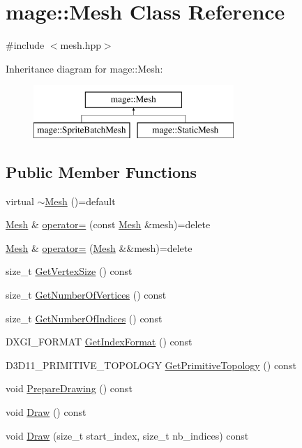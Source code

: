 \hypertarget{classmage_1_1_mesh}{}\section{mage\+:\+:Mesh Class Reference}
\label{classmage_1_1_mesh}


{\ttfamily \#include $<$mesh.\+hpp$>$}

Inheritance diagram for mage\+:\+:Mesh\+:\begin{figure}[H]
\begin{center}
\leavevmode
\includegraphics[height=2.000000cm]{classmage_1_1_mesh}
\end{center}
\end{figure}
\subsection*{Public Member Functions}
\begin{DoxyCompactItemize}
\item 
virtual \hyperlink{classmage_1_1_mesh_a53b4b9054a518c1f7e2078fdc65a95b8}{$\sim$\+Mesh} ()=default
\item 
\hyperlink{classmage_1_1_mesh}{Mesh} \& \hyperlink{classmage_1_1_mesh_a5baf961af32b379671a59a082492bc5e}{operator=} (const \hyperlink{classmage_1_1_mesh}{Mesh} \&mesh)=delete
\item 
\hyperlink{classmage_1_1_mesh}{Mesh} \& \hyperlink{classmage_1_1_mesh_a28e437196db171b2df1c4bcf3df07a63}{operator=} (\hyperlink{classmage_1_1_mesh}{Mesh} \&\&mesh)=delete
\item 
size\+\_\+t \hyperlink{classmage_1_1_mesh_a2421eac892ef5fd6db21d8214c02e774}{Get\+Vertex\+Size} () const
\item 
size\+\_\+t \hyperlink{classmage_1_1_mesh_a47732f4ac48000c2a1f5562bdba38a81}{Get\+Number\+Of\+Vertices} () const
\item 
size\+\_\+t \hyperlink{classmage_1_1_mesh_a69991b73609ebf936df5c7d2afd2b767}{Get\+Number\+Of\+Indices} () const
\item 
D\+X\+G\+I\+\_\+\+F\+O\+R\+M\+AT \hyperlink{classmage_1_1_mesh_ac76cf9345039a7170597a0e5219a71f9}{Get\+Index\+Format} () const
\item 
D3\+D11\+\_\+\+P\+R\+I\+M\+I\+T\+I\+V\+E\+\_\+\+T\+O\+P\+O\+L\+O\+GY \hyperlink{classmage_1_1_mesh_a3628c67de9562e31a8266a51776c903a}{Get\+Primitive\+Topology} () const
\item 
void \hyperlink{classmage_1_1_mesh_a728979ae0be55283813eecf3e7c40e80}{Prepare\+Drawing} () const
\item 
void \hyperlink{classmage_1_1_mesh_a62f7b8176f7747f2b4db7674524a146c}{Draw} () const
\item 
void \hyperlink{classmage_1_1_mesh_ae1f71bddbb1fa3b45cec55f0fe920c7d}{Draw} (size\+\_\+t start\+\_\+index, size\+\_\+t nb\+\_\+indices) const
\end{DoxyCompactItemize}
